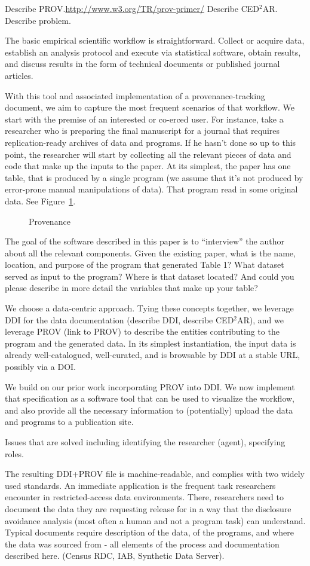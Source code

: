 Describe PROV.\url{http://www.w3.org/TR/prov-primer/} Describe CED$^2$AR. Describe problem.

The basic empirical scientific workflow is straightforward. Collect or acquire data, establish an analysis protocol and execute via statistical software, obtain results, and discuss results in the form of technical documents or published journal articles. 

With this tool and associated implementation of a provenance-tracking document, we aim to capture the most frequent scenarios of that workflow. We start with the premise of an interested or co-erced user. For instance, take a researcher who is preparing the final manuscript for a journal that requires replication-ready archives of data and programs. If he hasn't done so up to this point, the researcher will start by collecting all the relevant pieces of data and code that make up the inputs to the paper. At its simplest, the paper has one table, that is produced by a single program (we assume that it's not produced by error-prone manual manipulations of data). That program read in some original data. See Figure~\ref{fig:workflow:simplistic}.
\begin{figure}[!h]
\centering
\caption{Provenance}\label{fig:workflow:simplistic}

\end{figure}

The goal of the software described in this paper is to ``interview'' the author about all the relevant components. Given the existing paper, what is the name, location, and purpose of the program that generated Table 1? What dataset served as input to the program? Where is that dataset located? And could you please describe in more detail the variables that make up your table? 

We choose a data-centric approach. Tying these concepts together, we leverage DDI for the data documentation (describe DDI, describe CED$^2$AR), and we leverage PROV (link to PROV) to describe the entities contributing to the program and the generated data. In its simplest instantiation, the input data is already well-catalogued, well-curated, and is browsable by DDI at a stable URL, possibly via a DOI. 

We build on our prior work incorporating PROV into DDI. We now implement that specification as a software tool that can be used to visualize the workflow, and also provide all the necessary information to (potentially) upload the data and programs to a publication site.

Issues that are solved including identifying the researcher (agent), specifying roles. 

The resulting DDI+PROV file is machine-readable, and complies with two widely used standards. An immediate application is the frequent task researchers encounter in restricted-access data environments. There, researchers need to document the data they are requesting release for in a way that the disclosure avoidance analysis (most often a human and not a program task) can understand. Typical documents require description of the data, of the programs, and where the data was sourced from - all elements of the process and documentation described here. (Census RDC, IAB, Synthetic Data Server).
